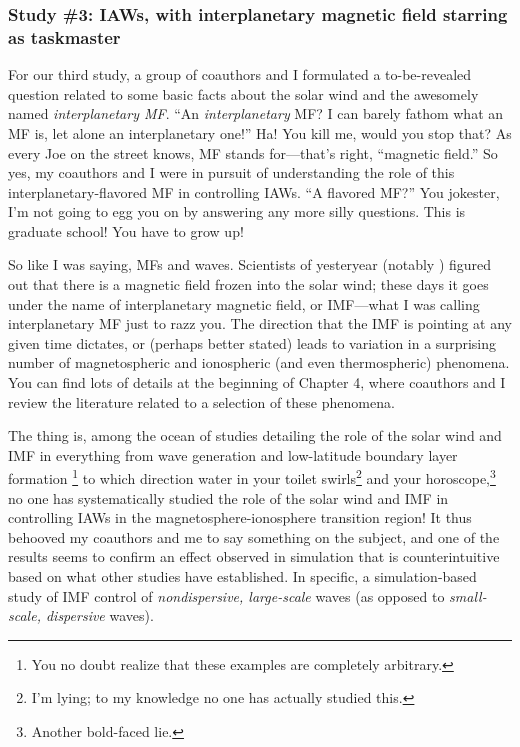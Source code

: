 \subsubsection{Study \#3: IAWs, with interplanetary magnetic field starring as taskmaster}

For our third study, a group of coauthors and I formulated a to-be-revealed
question related to some basic facts about the solar wind and the awesomely
named \emph{interplanetary MF}. ``An \emph{interplanetary} MF? I can barely
fathom what an MF is, let alone an interplanetary one!'' Ha! You kill me, would
you stop that? As every Joe on the street knows, MF stands for---that's right,
``magnetic field.'' So yes, my coauthors and I were in pursuit of understanding
the role of this interplanetary-flavored MF in controlling IAWs. ``A flavored
MF?'' You jokester, I'm not going to egg you on by answering any more silly
questions. This is graduate school! You have to grow up!

So like I was saying, MFs and waves. Scientists of yesteryear (notably
\citet{Parker1958}) figured out that there is a magnetic field frozen into the
solar wind; these days it goes under the name of interplanetary magnetic field,
or IMF---what I was calling interplanetary MF just to razz you. The direction
that the IMF is pointing at any given time dictates, or (perhaps better stated)
leads to variation in a surprising number of magnetospheric and ionospheric (and
even thermospheric) phenomena. You can find lots of details at the beginning of
Chapter 4, where coauthors and I review the literature related to a selection of
these phenomena.

The thing is, among the ocean of studies detailing the role of the solar wind
and IMF in everything from wave generation \citep[][for
example]{Claudepierre2008} and low-latitude boundary layer formation
\citep{Song2003a}\footnote{You no doubt realize that these examples are
  completely arbitrary.}  to which direction water in your toilet
swirls\footnote{I'm lying; to my knowledge no one has actually studied this.}
and your horoscope,\footnote{Another bold-faced lie.} no one has systematically
studied the role of the solar wind and IMF in controlling IAWs in the
magnetosphere-ionosphere transition region!  It thus behooved my coauthors and
me to say something on the subject, and one of the results seems to confirm an
effect observed in simulation that is counterintuitive based on what other
studies have established. In specific, a simulation-based study of IMF control
of \emph{nondispersive, large-scale} \Alf waves (as opposed to
\emph{small-scale, dispersive} \Alf waves).

